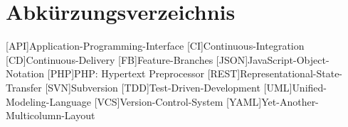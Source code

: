 \chapter{Abkürzungsverzeichnis}

\begin{acronym}
[API]{Application-Programming-Interface}
[CI]{Continuous-Integration}
[CD]{Continuous-Delivery}
[FB]{Feature-Branches}
[JSON]{JavaScript-Object-Notation}
[PHP]{PHP: Hypertext Preprocessor}
[REST]{Representational-State-Transfer}
[SVN]{Subversion}
[TDD]{Test-Driven-Development}
[UML]{Unified-Modeling-Language}
[VCS]{Version-Control-System}
[YAML]{Yet-Another-Multicolumn-Layout}
\end{acronym}

